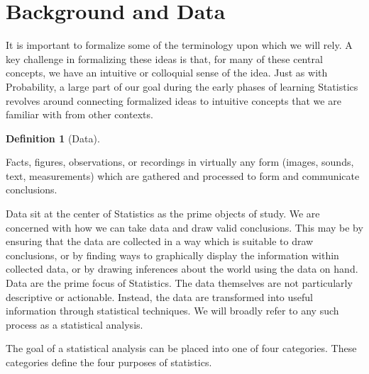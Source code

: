 \documentclass[
  letterpaper,
  DIV=11,
  numbers=noendperiod]{scrreprt}
\theoremstyle{definition}
\theoremstyle{definition}
\theoremstyle{definition}
\newtheorem{definition}{Definition}[chapter]
\theoremstyle{remark}
\begin{document}
\section{Background and Data}\label{background-and-data}

It is important to formalize some of the terminology upon which we will
rely. A key challenge in formalizing these ideas is that, for many of
these central concepts, we have an intuitive or colloquial sense of the
idea. Just as with Probability, a large part of our goal during the
early phases of learning Statistics revolves around connecting
formalized ideas to intuitive concepts that we are familiar with from
other contexts.

\begin{definition}[Data]\protect\hypertarget{def-data}{}\label{def-data}

Facts, figures, observations, or recordings in virtually any form
(images, sounds, text, measurements) which are gathered and processed to
form and communicate conclusions.

\end{definition}

Data sit at the center of Statistics as the prime objects of study. We
are concerned with how we can take data and draw valid conclusions. This
may be by ensuring that the data are collected in a way which is
suitable to draw conclusions, or by finding ways to graphically display
the information within collected data, or by drawing inferences about
the world using the data on hand. Data are the prime focus of
Statistics. The data themselves are not particularly descriptive or
actionable. Instead, the data are transformed into useful information
through statistical techniques. We will broadly refer to any such
process as a statistical analysis.

The goal of a statistical analysis can be placed into one of four
categories. These categories define the four purposes of statistics.
\end{document}
